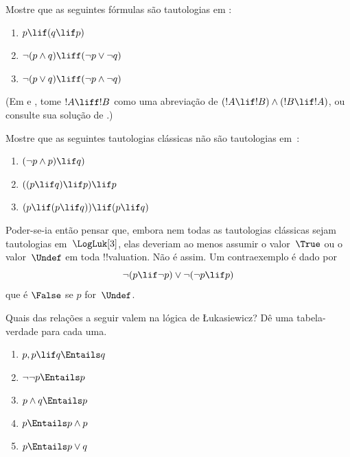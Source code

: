 \documentclass[../../../include/open-logic-section]{subfiles}
\begin{document}
\begin{prob}
  Mostre que as seguintes fórmulas são tautologias em \LogLuk[3]:
  \begin{enumerate}
    \item $p \lif (q \lif p)$
    \item\label{mvl:thr:luk:prob:luk-taut-2} $\lnot(p \land q) \liff (\lnot p \lor \lnot q)$
    \item\label{mvl:thr:luk:prob:luk-taut-3} $\lnot(p \lor q) \liff (\lnot p \land \lnot q)$
  \end{enumerate}
  (Em  e
  , tome $!A \liff !B$ como uma
  abreviação de $(!A \lif !B) \land (!B \lif !A)$, ou consulte sua
  solução de .)
\end{prob}

\begin{prob}
  Mostre que as seguintes tautologias clássicas não são tautologias em~\LogLuk[3]:
  \begin{enumerate}
    \item $(\lnot p \land p) \lif q)$
    \item $((p \lif q) \lif p) \lif p$
    \item $(p \lif (p \lif q)) \lif (p \lif q)$
  \end{enumerate}
\end{prob}

Poder-se-ia então pensar que, embora nem todas as tautologias clássicas
sejam tautologias em~$\LogLuk[3]$, elas deveriam ao menos assumir
o valor~$\True$ ou o valor~$\Undef$ em toda
!!{valuation}. Não é assim. Um contraexemplo é dado por
\[
  \lnot(p \lif \lnot p) \lor \lnot(\lnot p \lif p)
\]
que é $\False$ se $p$ for~$\Undef$.

\begin{prob}
  Quais das relações a seguir valem na lógica de \L ukasiewicz? Dê uma tabela-verdade para cada uma.
  \begin{enumerate}
    \item $p, p \lif q \Entails q$
    \item $\lnot\lnot p \Entails p$
    \item $p \land q \Entails p$
    \item $p \Entails p \land p$
    \item $p \Entails p \lor q$
  \end{enumerate}
\end{prob}
\end{document}
